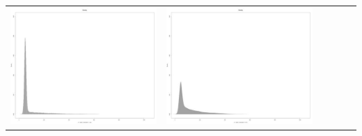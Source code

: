 \begin{table}[htbp]
{\begin{tabular}{l | ccccc}
\begin{minipage}{.15\textwidth}
     			 	\includegraphics[width=\linewidth]{images/mema-dens-graph/I3}
    				 \end{minipage}
    			   & \begin{minipage}{.15\textwidth}
     			 	\includegraphics[width=\linewidth]{images/mema-dens-graph/I7}
    				 \end{minipage}
    			   &	 \begin{minipage}{.15\textwidth}

\end{minipage}
\end{tabular}}
\end{table}
